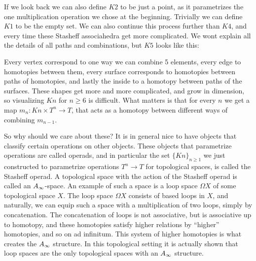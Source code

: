  
If we look back we can also define $ K2$ to be just a point, as it parametrizes the one multiplication operation we chose at the beginning. Trivially we can define $ K1$ to be the empty set. We can also continue this process further than $ K4$, and every time these Stasheff associahedra get more complicated. We wont explain all the details of all paths and combinations, but $ K5$ looks like this:

\begin{center}
\def\svgwidth{0.5\textwidth}

\end{center}

Every vertex correspond to one way we can combine 5 elements, every edge to homotopies between them, every surface corresponds to homotopies between paths of homotopies, and lastly the inside to a homotopy between paths of the surfaces. These shapes get more and more complicated, and grow in dimension, so visualizing $Kn$ for $n\geq 6$ is difficult. What matters is that for every $n$ we get a map $m_n:Kn\times T^n\longrightarrow T$, that acts as a homotopy between different ways of combining $m_{n-1}$.

 

\begin{remark}
So why should we care about these? It is in general nice to have objects that classify certain operations on other objects. These objects that parametrize operations are called operads, and in particular the set $\{Kn\}_{n\geq 1}$ we just constructed to parametrize operations $T^n\longrightarrow T$ for topological spaces, is called the Stasheff operad. A topological space with the action of the Stasheff operad is called an $A_{\infty}$-space. An example of such a space is a loop space $\Omega X$ of some topological space $X$. The loop space $\Omega X$ consists of based loops in $X$, and naturally, we can equip such a space with a multiplication of two loops, simply by concatenation. The concatenation of loops is not associative, but is associative up to homotopy, and these homotopies satisfy higher relations by ``higher'' homotopies, and so on ad infinitum. This system of higher homotopies is what creates the $A_{\infty}$ structure. In this topological setting it is actually shown that loop spaces are the only topological spaces with an $A_{\infty}$ structure. 
\end{remark}
